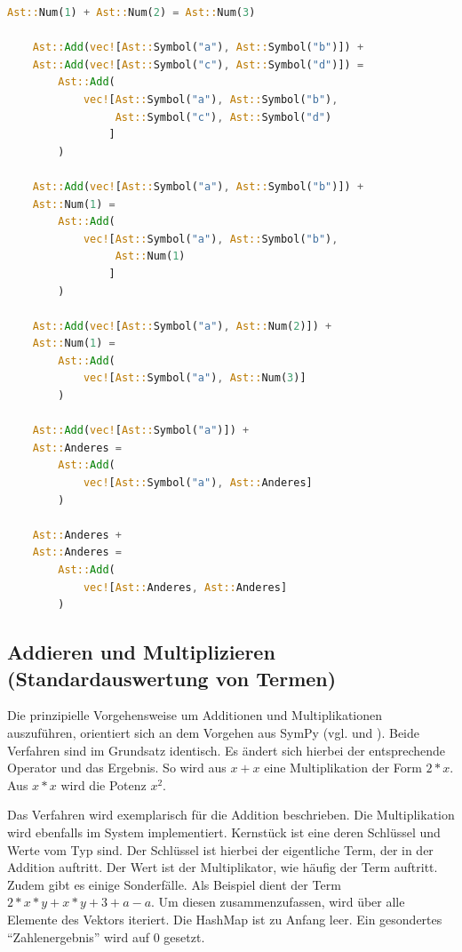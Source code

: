 \documentclass[11pt,a4paper, ngerman]{article}
\begin{document}
\begin{lstlisting}[language=rust, caption={Operatenüberladung für Addition}]
    Ast::Num(1) + Ast::Num(2) = Ast::Num(3)

    Ast::Add(vec![Ast::Symbol("a"), Ast::Symbol("b")]) +
    Ast::Add(vec![Ast::Symbol("c"), Ast::Symbol("d")]) = 
        Ast::Add(
            vec![Ast::Symbol("a"), Ast::Symbol("b"), 
                 Ast::Symbol("c"), Ast::Symbol("d")
                ]
        )

    Ast::Add(vec![Ast::Symbol("a"), Ast::Symbol("b")]) +
    Ast::Num(1) =
        Ast::Add(
            vec![Ast::Symbol("a"), Ast::Symbol("b"), 
                 Ast::Num(1)
                ]
        )

    Ast::Add(vec![Ast::Symbol("a"), Ast::Num(2)]) +
    Ast::Num(1) =
        Ast::Add(
            vec![Ast::Symbol("a"), Ast::Num(3)]
        )

    Ast::Add(vec![Ast::Symbol("a")]) +
    Ast::Anderes =
        Ast::Add(
            vec![Ast::Symbol("a"), Ast::Anderes]
        )

    Ast::Anderes +
    Ast::Anderes =
        Ast::Add(
            vec![Ast::Anderes, Ast::Anderes]
        )
\end{lstlisting}

\label{sec:kapAddnundMult}
\subsection{Addieren und Multiplizieren (Standardauswertung von Termen)}
Die prinzipielle Vorgehensweise um Additionen und Multiplikationen auszuführen, orientiert sich an dem Vorgehen aus SymPy (vgl. \cite{SymPyAddFlatten} und \cite{SymPyMulFlatten}). Beide Verfahren sind im Grundsatz identisch. Es ändert sich hierbei der entsprechende Operator und das Ergebnis. So wird aus $x+x$ eine Multiplikation der Form $2*x$. Aus $x*x$ wird die Potenz $x^2$. 

Das Verfahren wird exemplarisch für die Addition beschrieben. Die Multiplikation wird ebenfalls im System implementiert. Kernstück ist eine  deren Schlüssel und Werte vom Typ  sind. Der Schlüssel ist hierbei der eigentliche Term, der in der Addition auftritt. Der Wert ist der Multiplikator, wie häufig der Term auftritt. Zudem gibt es einige Sonderfälle. Als Beispiel dient der Term 
$2*x*y + x*y + 3 + a - a$. Um diesen zusammenzufassen, wird über alle Elemente des Vektors iteriert. Die HashMap ist zu Anfang leer. Ein gesondertes ``Zahlenergebnis'' wird auf $0$ gesetzt.
\end{document}
